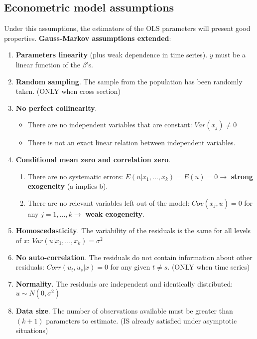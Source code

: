 \documentclass[10pt, a4paper, landscape]{extarticle}
\begin{document}
\begin{multicols}{3}
	\subsection*{Econometric model assumptions}
		Under this assumptions, the estimators of the OLS parameters will present good properties. \textbf{Gauss-Markov assumptions extended}:
		\begin{enumerate}[leftmargin=*]
			\item \textbf{Parameters linearity} (plus weak dependence in time series). $y$ must be a linear function of the $\beta$'s.
			\item \textbf{Random sampling}. The sample from the population has been randomly taken. (ONLY when cross section)
			\item \textbf{No perfect collinearity}.
			\begin{itemize}[leftmargin=*]
				\item There are no independent variables that are constant: $Var(x_j) \neq 0$
				\item There is not an exact linear relation between independent variables.
			\end{itemize}
			\item \textbf{Conditional mean zero and correlation zero}.
			\begin{enumerate}[leftmargin=*, label=\alph*.]
				\item There are no systematic errors: $E(u | x_1, ..., x_k) = E(u) = 0 \rightarrow$ \textbf{strong exogeneity} (a implies b).
				\item There are no relevant variables left out of the model: $Cov(x_j , u) = 0$ for any $j = 1, ..., k \rightarrow$ \textbf{weak exogeneity}.
			\end{enumerate}
			\item \textbf{Homoscedasticity}. The variability of the residuals is the same for all levels of $x$: $Var(u | x_1, ..., x_k) = \sigma^2$
			\item \textbf{No auto-correlation}. The residuals do not contain information about other residuals: $Corr(u_t, u_s | x) = 0$ for any given $t \neq s$. (ONLY when time series)
			\item \textbf{Normality}. The residuals are independent and identically distributed: $u \sim N(0,\sigma^2)$
			\item \textbf{Data size}. The number of observations available must be greater than $(k + 1)$ parameters to estimate. (IS already satisfied under asymptotic situations)		
		\end{enumerate}		

\end{multicols}
\end{document}
